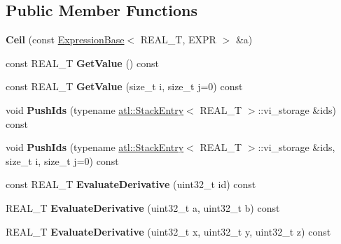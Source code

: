 \subsection*{Public Member Functions}
\begin{DoxyCompactItemize}
\item 
\hypertarget{structatl_1_1_ceil_a77b35f66ea63f9f52445bb3bdb2ae254}{{\bfseries Ceil} (const \hyperlink{structatl_1_1_expression_base}{Expression\+Base}$<$ R\+E\+A\+L\+\_\+\+T, E\+X\+P\+R $>$ \&a)}\label{structatl_1_1_ceil_a77b35f66ea63f9f52445bb3bdb2ae254}

\item 
\hypertarget{structatl_1_1_ceil_a7a666fa878458db83fdf26675df3c977}{const R\+E\+A\+L\+\_\+\+T {\bfseries Get\+Value} () const }\label{structatl_1_1_ceil_a7a666fa878458db83fdf26675df3c977}

\item 
\hypertarget{structatl_1_1_ceil_a8191d630fa233e453bb1c9b19a82d189}{const R\+E\+A\+L\+\_\+\+T {\bfseries Get\+Value} (size\+\_\+t i, size\+\_\+t j=0) const }\label{structatl_1_1_ceil_a8191d630fa233e453bb1c9b19a82d189}

\item 
\hypertarget{structatl_1_1_ceil_a1d418e693c8e74abbc0383a0159a0b31}{void {\bfseries Push\+Ids} (typename \hyperlink{structatl_1_1_stack_entry}{atl\+::\+Stack\+Entry}$<$ R\+E\+A\+L\+\_\+\+T $>$\+::vi\+\_\+storage \&ids) const }\label{structatl_1_1_ceil_a1d418e693c8e74abbc0383a0159a0b31}

\item 
\hypertarget{structatl_1_1_ceil_a5b445cc02c0668379f8b3fdce1eac855}{void {\bfseries Push\+Ids} (typename \hyperlink{structatl_1_1_stack_entry}{atl\+::\+Stack\+Entry}$<$ R\+E\+A\+L\+\_\+\+T $>$\+::vi\+\_\+storage \&ids, size\+\_\+t i, size\+\_\+t j=0) const }\label{structatl_1_1_ceil_a5b445cc02c0668379f8b3fdce1eac855}

\item 
\hypertarget{structatl_1_1_ceil_a40b57710a46f166a8b437719fb252ab8}{const R\+E\+A\+L\+\_\+\+T {\bfseries Evaluate\+Derivative} (uint32\+\_\+t id) const }\label{structatl_1_1_ceil_a40b57710a46f166a8b437719fb252ab8}

\item 
\hypertarget{structatl_1_1_ceil_af3dcb4db885987e2b679c9583f967284}{R\+E\+A\+L\+\_\+\+T {\bfseries Evaluate\+Derivative} (uint32\+\_\+t a, uint32\+\_\+t b) const }\label{structatl_1_1_ceil_af3dcb4db885987e2b679c9583f967284}

\item 
\hypertarget{structatl_1_1_ceil_a3164f3d2a1aeca0e1ab1c2bbb6f0f2a8}{R\+E\+A\+L\+\_\+\+T {\bfseries Evaluate\+Derivative} (uint32\+\_\+t x, uint32\+\_\+t y, uint32\+\_\+t z) const }\label{structatl_1_1_ceil_a3164f3d2a1aeca0e1ab1c2bbb6f0f2a8}


\end{DoxyCompactItemize}

